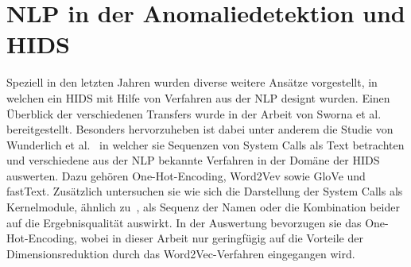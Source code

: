         

\section{NLP in der Anomaliedetektion und HIDS}\label{sec:related_nlp}

        Speziell in den letzten Jahren wurden diverse weitere Ansätze vorgestellt, in welchen ein \ac{HIDS} mit Hilfe von Verfahren aus der \ac{NLP} designt wurden.
        Einen Überblick der verschiedenen Transfers wurde in der Arbeit von Sworna et al.~\cite{NLPHIDSSWORNA2022} bereitgestellt.
        Besonders hervorzuheben ist dabei unter anderem die Studie von Wunderlich et al.~\cite{W2VWUNDERLICH2019} in welcher sie Sequenzen von System Calls als Text betrachten und verschiedene aus der \ac{NLP} bekannte Verfahren in der Domäne der \ac{HIDS} auswerten.
        Dazu gehören One-Hot-Encoding, Word2Vev sowie GloVe und fastText. 
        Zusätzlich untersuchen sie wie sich die Darstellung der System Calls als Kernelmodule, ähnlich zu~\cite{SYSTEM_STATES}, als Sequenz der Namen oder die Kombination beider auf die Ergebnisqualität auswirkt.
        In der Auswertung bevorzugen sie das One-Hot-Encoding, wobei in dieser Arbeit nur geringfügig auf die Vorteile der Dimensionsreduktion durch das Word2Vec-Verfahren eingegangen wird.

